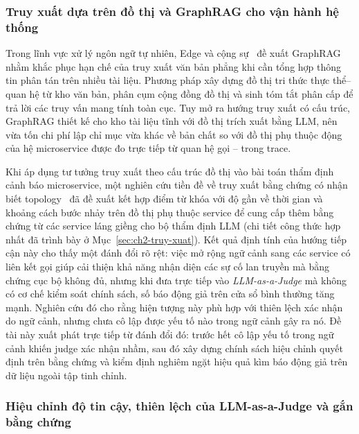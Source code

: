\subsubsection{Truy xuất dựa trên đồ thị và GraphRAG cho vận hành hệ thống}
\label{sec:ch3-graphrag}

Trong lĩnh vực xử lý ngôn ngữ tự nhiên, Edge và cộng sự~\cite{edge2024graphrag} đề xuất GraphRAG nhằm khắc phục hạn chế của truy xuất văn bản phẳng khi cần tổng hợp thông tin phân tán trên nhiều tài liệu. Phương pháp xây dựng đồ thị tri thức thực thể--quan hệ từ kho văn bản, phân cụm cộng đồng đồ thị và sinh tóm tắt phân cấp để trả lời các truy vấn mang tính toàn cục. Tuy mở ra hướng truy xuất có cấu trúc, GraphRAG thiết kế cho kho tài liệu tĩnh với đồ thị trích xuất bằng LLM, nên vừa tốn chi phí lập chỉ mục vừa khác về bản chất so với đồ thị phụ thuộc động của hệ microservice được đo trực tiếp từ quan hệ gọi -- trong trace.

Khi áp dụng tư tưởng truy xuất theo cấu trúc đồ thị vào bài toán thẩm định cảnh báo microservice, một nghiên cứu tiền đề về truy xuất bằng chứng có nhận biết topology~\cite{icaetm2026} đã đề xuất kết hợp điểm từ khóa  với độ gần về thời gian và khoảng cách bước nhảy trên đồ thị phụ thuộc service để cung cấp thêm bằng chứng từ các service láng giềng cho bộ thẩm định LLM (chi tiết công thức hợp nhất đã trình bày ở Mục~\ref{sec:ch2-truy-xuat}). Kết quả định tính của hướng tiếp cận này cho thấy một đánh đổi rõ rệt: việc mở rộng ngữ cảnh sang các service có liên kết gọi giúp cải thiện khả năng nhận diện các sự cố lan truyền mà bằng chứng cục bộ không đủ, nhưng khi đưa trực tiếp vào \emph{LLM-as-a-Judge} mà không có cơ chế kiểm soát chính sách, số báo động giả trên cửa sổ bình thường tăng mạnh. Nghiên cứu đó cho rằng hiện tượng này phù hợp với thiên lệch xác nhận do ngữ cảnh, nhưng chưa cô lập được yếu tố nào trong ngữ cảnh gây ra nó. Đề tài này xuất phát trực tiếp từ đánh đổi đó: trước hết cô lập yếu tố trong ngữ cảnh khiến judge xác nhận nhầm, sau đó xây dựng chính sách hiệu chỉnh quyết định trên bằng chứng và kiểm định nghiêm ngặt hiệu quả kìm báo động giả trên dữ liệu ngoài tập tinh chỉnh.

\subsubsection{Hiệu chỉnh độ tin cậy, thiên lệch của LLM-as-a-Judge và gắn bằng chứng}
\label{sec:ch3-calibration}

